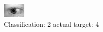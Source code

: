 \begin{figure}[h!]
\begin{center}
\includegraphics[width=0.60\columnwidth]{figures/ID821_class_2_target_4.png}
\end{center}
\caption{ Classification: 2 actual target: 4}
\label{fig:ID821_class_2_target_4}
\end{figure}
